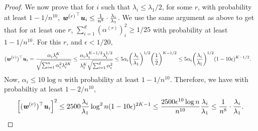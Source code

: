 \begin{proof}
We now prove that for $i$ such that $\lambda_i \leq \lambda_1/2$, for some $r$, with probability at least $1-1/n^{10}$, ${\boldsymbol{\mathit{w}}^{(r)}}^{\top}\boldsymbol{\mathit{u}}_i \leq \frac{1}{n^8}\cdot \frac{\lambda_i}{\lambda_1}$. We use the same argument as above to get that for at least one $r$, $\sum_{i=1}^d(\alpha^{(r)})_i^2 \geq 1/25$ with probability at least $1-1/n^{10}$. For this $r$, and $\epsilon<1/20$,
\begin{align*}
(\ww^{(r)})^{\top}\uu_i & = \frac{\alpha_i\lambda_i^K}{\sqrt{\sum_{i=1}^n\alpha_i^2\lambda_i^{2K}}} \leq  \frac{\alpha_i\lambda_i^{K-1/2}\lambda_i^{1/2}}{\lambda_1^K\sqrt{\sum_{i=1}^d\alpha_i^2}}\leq 5\alpha_i \left(\frac{\lambda_i}{\lambda_1}\right)^{1/2}\left(\frac{1}{2}\right)^{K-1/2} \leq 5\alpha_i \left(\frac{\lambda_i}{\lambda_1}\right)^{1/2}(1-10\epsilon)^{K-1/2}.
\end{align*}
Now, $\alpha_i\leq 10\log n$ with probability at least $1-1/n^{10}$. Therefore, we have with probabiltiy at least $1-2/n^{10}$,
\[
\left[(\ww^{(r)})^{\top}\uu_i\right]^2 \leq 2500\frac{\lambda_i}{\lambda_1} \log^2 n (1-10\epsilon)^{2K-1} \leq \frac{2500 \epsilon^{10}\log n}{n^{10}}\frac{\lambda_i}{\lambda_1} \leq \frac{1}{n^8} \cdot \frac{\lambda_i}{\lambda_1}.
\]
\end{proof}

